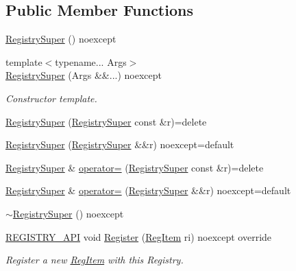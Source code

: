 \subsection*{Public Member Functions}
\begin{DoxyCompactItemize}
\item 
\hyperlink{classregistry_1_1RegistrySuper_a07a71ff200feeaa1252153f9bacac6c2}{Registry\+Super} () noexcept
\item 
{\footnotesize template$<$typename... Args$>$ }\\\hyperlink{classregistry_1_1RegistrySuper_adcd4a5b588b3f91c9fa8f89a3d4a0c17}{Registry\+Super} (Args \&\&...) noexcept
\begin{DoxyCompactList}\small\item\em Constructor template. \end{DoxyCompactList}\item 
\hyperlink{classregistry_1_1RegistrySuper_a2e55cdc019369037f837f5c0b65028cb}{Registry\+Super} (\hyperlink{classregistry_1_1RegistrySuper}{Registry\+Super} const \&r)=delete
\item 
\hyperlink{classregistry_1_1RegistrySuper_a0db417f1cc070d6befa5c311da544a6d}{Registry\+Super} (\hyperlink{classregistry_1_1RegistrySuper}{Registry\+Super} \&\&r) noexcept=default
\item 
\hyperlink{classregistry_1_1RegistrySuper}{Registry\+Super} \& \hyperlink{classregistry_1_1RegistrySuper_aa8c95312234f4ba77a0ae268c83c1fd3}{operator=} (\hyperlink{classregistry_1_1RegistrySuper}{Registry\+Super} const \&r)=delete
\item 
\hyperlink{classregistry_1_1RegistrySuper}{Registry\+Super} \& \hyperlink{classregistry_1_1RegistrySuper_ae9a9efe75a1abecc6ef873fe19872d2b}{operator=} (\hyperlink{classregistry_1_1RegistrySuper}{Registry\+Super} \&\&r) noexcept=default
\item 
\hyperlink{classregistry_1_1RegistrySuper_a80a46da9b76998a81383a0b288c897eb}{$\sim$\+Registry\+Super} () noexcept
\item 
\hyperlink{registry__core_8hpp_a8e344a5f1098eda0aa0bc66b1c45ace4}{R\+E\+G\+I\+S\+T\+R\+Y\+\_\+\+A\+PI} void \hyperlink{classregistry_1_1RegistrySuper_a6293786807c1d9cc1f72a60c8c218b6f}{Register} (\hyperlink{classregistry_1_1RegItem}{Reg\+Item} ri) noexcept override
\begin{DoxyCompactList}\small\item\em Register a new \hyperlink{classregistry_1_1RegItem}{Reg\+Item} with this Registry. \end{DoxyCompactList}\item 

\end{DoxyCompactItemize}
